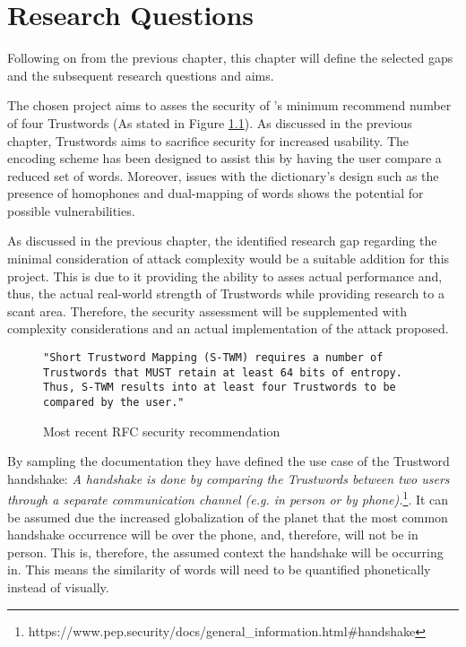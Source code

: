 \chapter{Research Questions}

Following on from the previous chapter, this chapter will define the selected gaps and the subsequent research questions and aims.

The chosen project aims to asses the security of \pep's minimum recommend number of four Trustwords (As stated in Figure \ref{fig:trustwordsNum}). As discussed in the previous chapter, Trustwords aims to sacrifice security for increased usability. The encoding scheme has been designed to assist this by having  the user compare a reduced set of words. Moreover, issues with the dictionary's design such as the presence of homophones and dual-mapping of words shows the potential for possible vulnerabilities. 

As discussed in the previous chapter, the identified research gap regarding the minimal consideration of attack complexity would be a suitable addition for this project. This is due to it providing the ability to asses actual performance and, thus, the actual real-world strength of Trustwords while providing research to a scant area. Therefore, the security assessment will be supplemented with complexity considerations and an actual implementation of the attack proposed.

\begin{figure}[h!]
    \centering
    \begin{verbatim}
"Short Trustword Mapping (S-TWM) requires a number of 
Trustwords that MUST retain at least 64 bits of entropy. 
Thus, S-TWM results into at least four Trustwords to be 
compared by the user."
    \end{verbatim}
    \caption{Most recent RFC security recommendation}
    \label{fig:trustwordsNum}
\end{figure}

By sampling the \pep documentation they have defined the use case of the Trustword handshake: \textit{A handshake is done by comparing the Trustwords between two users through a separate communication channel (e.g. in person or by phone).}\footnote{https://www.pep.security/docs/general\_information.html\#handshake}. It can be assumed due the increased globalization of the planet that the most common handshake occurrence will be over the phone, and, therefore, will not be in person. This is, therefore, the assumed context the handshake will be occurring in. This means the similarity of words will need to be quantified phonetically instead of visually.

